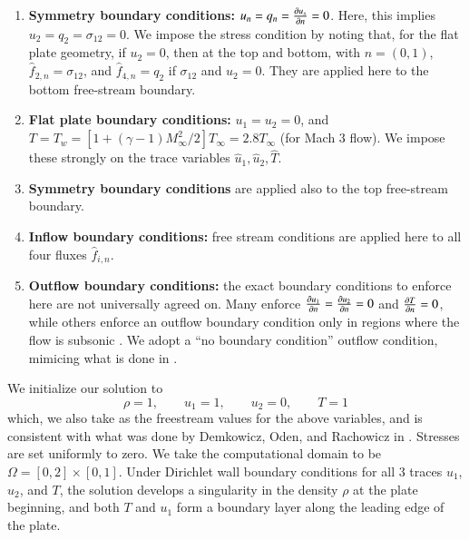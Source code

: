 \begin{enumerate}
\item \textbf{Symmetry boundary conditions:} $u_n = q_n = \pd{u_s}{n} = 0$. Here, this implies $u_2 = q_2 = \sigma_{12} = 0$. We impose the stress condition by noting that, for the flat plate geometry, if $u_2 = 0$, then at the top and bottom, with $n = (0,1)$, $\widehat{f}_{2,n} = \sigma_{12}$, and $\widehat{f}_{4,n} = q_2$ if $\sigma_{12}$ and $u_2 = 0$. They are applied here to the bottom free-stream boundary.
\item \textbf{Flat plate boundary conditions:} $u_1 = u_2 = 0$, and $T = T_w = \left[1+(\gamma-1)M_\infty^2/2\right] T_\infty = 2.8T_\infty$ (for Mach 3 flow). We impose these strongly on the trace variables $\widehat{u}_1, \widehat{u}_2, \widehat{T}$. 
\item \textbf{Symmetry boundary conditions} are applied also to the top free-stream boundary.
\item \textbf{Inflow boundary conditions:} free stream conditions are applied here to all four fluxes $\widehat{f}_{i,n}$.
\item \textbf{Outflow boundary conditions:} the exact boundary conditions to enforce here are not universally agreed on.  Many enforce $\pd{u_1}{n}=\pd{u_2}{n}=0$ and $\pd{T}{n} = 0$, while others enforce an outflow boundary condition only in regions where the flow is subsonic \cite{Demkowicz:1990:NFE:112271.112276}.  
We adopt a ``no boundary condition'' outflow condition, mimicing what is done in \cite{Shakib1991141}.%
\end{enumerate}

We initialize our solution to
\[
\rho = 1,\qquad u_1= 1,\qquad u_2 = 0, \qquad T = 1%
\]
which, we also take as the freestream values for the above variables, and is consistent with what was done by Demkowicz, Oden, and Rachowicz in \cite{Demkowicz1990275}. Stresses are set uniformly to zero.  We take the computational domain to be $\Omega = [0,2]\times[0,1]$. Under Dirichlet wall boundary conditions for all 3 traces $u_1$, $u_2$, and $T$, the solution develops a singularity in the density $\rho$ at the plate beginning, and both $T$ and $u_1$ form a boundary layer along the leading edge of the plate.  

